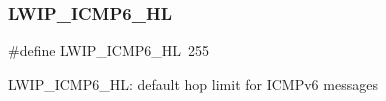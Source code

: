 \subsubsection{\texorpdfstring{L\+W\+I\+P\+\_\+\+I\+C\+M\+P6\+\_\+\+HL}{LWIP\_ICMP6\_HL}\hspace{0.1cm}{\footnotesize\ttfamily [2/2]}}
{\footnotesize\ttfamily \#define L\+W\+I\+P\+\_\+\+I\+C\+M\+P6\+\_\+\+HL~255}

L\+W\+I\+P\+\_\+\+I\+C\+M\+P6\+\_\+\+HL\+: default hop limit for I\+C\+M\+Pv6 messages 